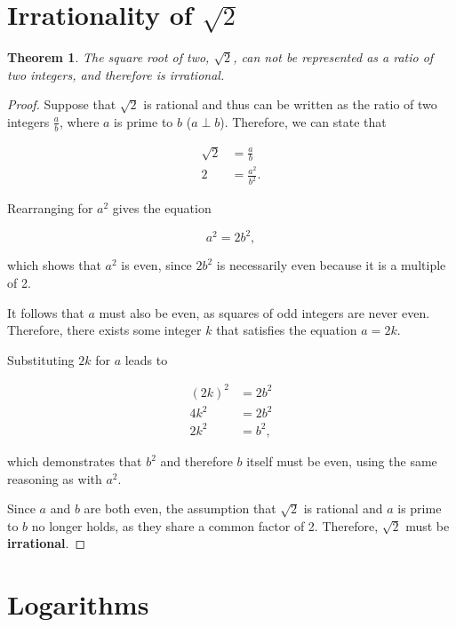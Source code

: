 \documentclass[parskip]{scrartcl}
\newtheorem{theorem}{Theorem}
\begin{document}
\section{Irrationality of \(\sqrt{2}\)}

\begin{theorem}
  The square root of two, \(\sqrt{2}\), can not be represented as a ratio of two
  integers, and therefore is irrational.
\end{theorem}

\begin{proof}
  Suppose that \(\sqrt{2}\) is rational and thus can be written as the ratio of
  two integers \(\frac{a}{b}\), where \(a\) is prime to \(b\) (\(a ⟂ b\)).
  Therefore, we can state that

  \begin{align*}
    \sqrt{2} &= \frac{a}{b} \\
    2 &= \frac{a^{2}}{b^{2}}.
  \end{align*}

  Rearranging for \(a^{2}\) gives the equation

  \begin{equation*}
    a^{2} = 2b^{2},
  \end{equation*}

  which shows that \(a^{2}\) is even, since \(2b^{2}\) is necessarily even
  because it is a multiple of 2.

  It follows that \(a\) must also be even, as squares of odd integers are never
  even. Therefore, there exists some integer \(k\) that satisfies the equation
  \(a = 2k\).

  Substituting \(2k\) for \(a\) leads to

  \begin{align*}
    {(2k)}^{2} &= 2b^{2} \\
    4k^{2} &= 2b^{2} \\
    2k^{2} &= b^{2},
  \end{align*}

  which demonstrates that \(b^{2}\) and therefore \(b\) itself must be even,
  using the same reasoning as with \(a^{2}\).

  Since \(a\) and \(b\) are both even, the assumption that \(\sqrt{2}\) is
  rational and \(a\) is prime to \(b\) no longer holds, as they share a common
  factor of 2. Therefore, \(\sqrt{2}\) must be \textbf{irrational}.
\end{proof}

\section{Logarithms}
\end{document}
